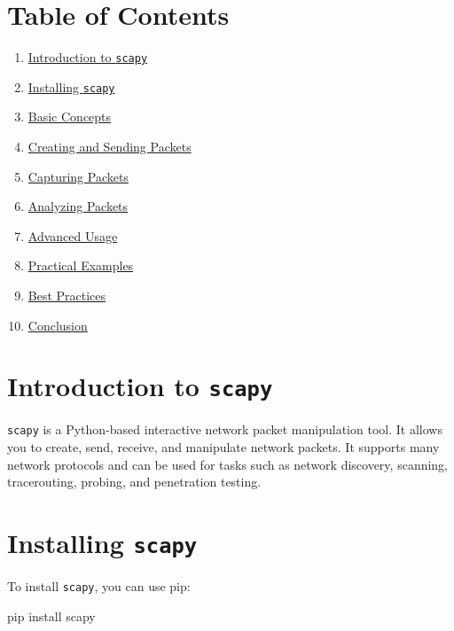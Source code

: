 \documentclass[
  letterpaper,
  DIV=11,
  numbers=noendperiod]{scrreprt}
\newenvironment{Shaded}{\begin{snugshade}}{\end{snugshade}}
\newcommand{\ExtensionTok}[1]{\textcolor[rgb]{0.00,0.23,0.31}{#1}}
\newcommand{\NormalTok}[1]{\textcolor[rgb]{0.00,0.23,0.31}{#1}}
\providecommand{\tightlist}{%
  \setlength{\itemsep}{0pt}\setlength{\parskip}{0pt}}\usepackage{longtable,booktabs,array}
\begin{document}
\section{Table of Contents}\label{table-of-contents-18}

\begin{enumerate}
\def\labelenumi{\arabic{enumi}.}
\tightlist
\item
  \hyperref[introduction-to-scapy]{Introduction to \texttt{scapy}}
\item
  \hyperref[installing-scapy]{Installing \texttt{scapy}}
\item
  \hyperref[basic-concepts]{Basic Concepts}
\item
  \hyperref[creating-and-sending-packets]{Creating and Sending Packets}
\item
  \hyperref[capturing-packets]{Capturing Packets}
\item
  \hyperref[analyzing-packets]{Analyzing Packets}
\item
  \hyperref[advanced-usage]{Advanced Usage}
\item
  \hyperref[practical-examples]{Practical Examples}
\item
  \hyperref[best-practices]{Best Practices}
\item
  \hyperref[conclusion]{Conclusion}
\end{enumerate}

\section{\texorpdfstring{Introduction to
\texttt{scapy}}{Introduction to scapy}}\label{introduction-to-scapy}

\texttt{scapy} is a Python-based interactive network packet manipulation
tool. It allows you to create, send, receive, and manipulate network
packets. It supports many network protocols and can be used for tasks
such as network discovery, scanning, tracerouting, probing, and
penetration testing.

\section{\texorpdfstring{Installing
\texttt{scapy}}{Installing scapy}}\label{installing-scapy-1}

To install \texttt{scapy}, you can use pip:

\begin{Shaded}
\begin{Highlighting}[]
\ExtensionTok{pip}\NormalTok{ install scapy}
\end{Highlighting}
\end{Shaded}
\end{document}
